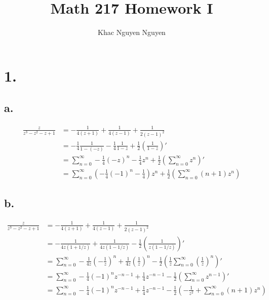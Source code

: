 \documentclass[11pt]{article}
\title{\textbf{Math 217 Homework I}}
\author{Khac Nguyen Nguyen}
\date{}
\begin{document}
\section*{1.}
\subsection*{a.}
\begin{equation*}
    \begin{aligned}
        \frac{z}{z^3-z^2-z+1} 
        &= -\frac{1}{4(z+1)} + \frac{1}{4(z-1)} + \frac{1}{2(z-1)^2} \\
        &= - \frac{1}{4} \frac{1}{1-(-z)} - \frac{1}{4} \frac{1}{1-z} + \frac{1}{2} \left(\frac{1}{1-z}\right)'\\
        &= \sum_{n=0}^\infty - \frac{1}{4} (-z)^n - \frac{1}{4} z^n + \frac{1}{2} \left(\sum_{n=0}^\infty z^n\right)' \\
        &= \sum_{n=0}^\infty \left(- \frac{1}{4}(-1)^n - \frac{1}{4} \right)z^n + \frac{1}{2} \left(\sum_{n=0}^\infty (n+1)z^{n}\right)
    \end{aligned}
\end{equation*}
\subsection*{b.}
\begin{equation*}
    \begin{aligned}
        \frac{z}{z^3-z^2-z+1} 
        &= -\frac{1}{4(z+1)} + \frac{1}{4(z-1)} + \frac{1}{2(z-1)^2} \\
        &= -\frac{1}{4z(1 + 1/z)}+ \frac{1}{4z(1-1/z)}- \frac{1}{2}\left(\frac{1}{z(1-1/z)} \right)' \\
        &=  \sum_{n=0}^\infty -\frac{1}{4z}\left(-\frac{1}{z}\right)^n + \frac{1}{4z} \left( \frac{1}{z}\right)^n - \frac{1}{2} \left(\frac{1}{z} \sum_{n=0}^\infty \left(\frac{1}{z}\right)^n \right)' \\
        &= \sum_{n=0}^\infty - \frac{1}{4} (-1)^n z^{-n-1} + \frac{1}{4} z^{-n-1} - \frac{1}{2} \left(\sum_{n=0}^\infty z^{n-1} \right)' \\
        &= \sum_{n=0}^\infty - \frac{1}{4} (-1)^n z^{-n-1} + \frac{1}{4} z^{-n-1} - \frac{1}{2} \left(- \frac{1}{z^2} + \sum_{n=0}^\infty (n+1)z^n \right) \\
    \end{aligned}
\end{equation*}
\end{document}
